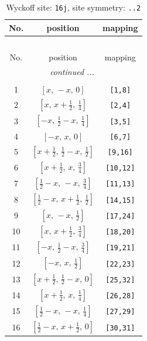 \documentclass[fleqn,8pt]{jsarticle}
\begin{document}
\renewcommand{\arraystretch}{1.2}
\begin{longtable}{ccc}
\caption{Wyckoff site: {\tt 16j}, site symmetry: {\tt ..2}}
 \\
 \hline \hline
No. & position & mapping \\ \hline \endfirsthead

\multicolumn{2}{l}{\tablename\ \thetable{}} \\
 \hline \hline
No. & position & mapping \\ \hline \endhead

 \hline \hline
\multicolumn{2}{r}{\footnotesize\it continued ...} \\ \endfoot

 \hline \hline
\multicolumn{2}{r}{} \\ \endlastfoot

1 & $\left[ x,\, - x,\, 0 \right]$ & {\tt [1,8]} \\ \hline
2 & $\left[ x,\, x + \frac{1}{2},\, \frac{1}{4} \right]$ & {\tt [2,4]} \\ \hline
3 & $\left[ - x,\, \frac{1}{2} - x,\, \frac{1}{4} \right]$ & {\tt [3,5]} \\ \hline
4 & $\left[ - x,\, x,\, 0 \right]$ & {\tt [6,7]} \\ \hline
5 & $\left[ x + \frac{1}{2},\, \frac{1}{2} - x,\, \frac{1}{2} \right]$ & {\tt [9,16]} \\ \hline
6 & $\left[ x + \frac{1}{2},\, x,\, \frac{3}{4} \right]$ & {\tt [10,12]} \\ \hline
7 & $\left[ \frac{1}{2} - x,\, - x,\, \frac{3}{4} \right]$ & {\tt [11,13]} \\ \hline
8 & $\left[ \frac{1}{2} - x,\, x + \frac{1}{2},\, \frac{1}{2} \right]$ & {\tt [14,15]} \\ \hline
9 & $\left[ x,\, - x,\, \frac{1}{2} \right]$ & {\tt [17,24]} \\ \hline
10 & $\left[ x,\, x + \frac{1}{2},\, \frac{3}{4} \right]$ & {\tt [18,20]} \\ \hline
11 & $\left[ - x,\, \frac{1}{2} - x,\, \frac{3}{4} \right]$ & {\tt [19,21]} \\ \hline
12 & $\left[ - x,\, x,\, \frac{1}{2} \right]$ & {\tt [22,23]} \\ \hline
13 & $\left[ x + \frac{1}{2},\, \frac{1}{2} - x,\, 0 \right]$ & {\tt [25,32]} \\ \hline
14 & $\left[ x + \frac{1}{2},\, x,\, \frac{1}{4} \right]$ & {\tt [26,28]} \\ \hline
15 & $\left[ \frac{1}{2} - x,\, - x,\, \frac{1}{4} \right]$ & {\tt [27,29]} \\ \hline
16 & $\left[ \frac{1}{2} - x,\, x + \frac{1}{2},\, 0 \right]$ & {\tt [30,31]} \\
\end{longtable}
\end{document}
